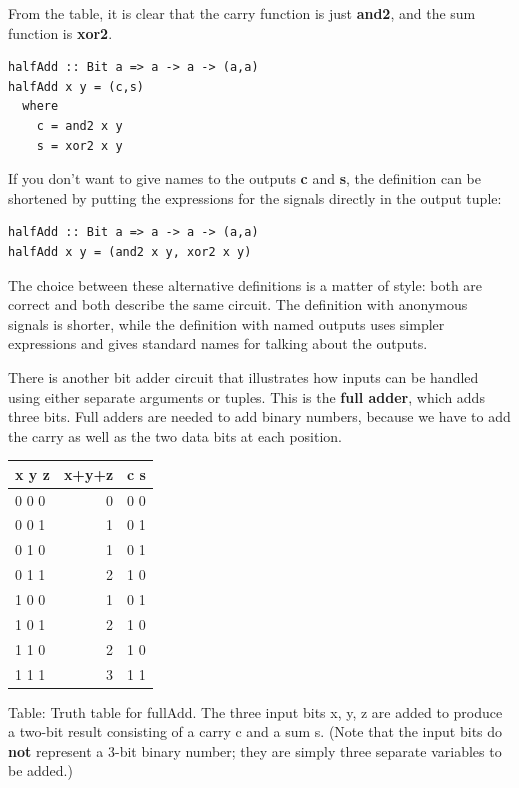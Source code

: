 \documentclass[]{svmono}
\begin{document}
From the table, it is clear that the carry function is just \textbf{and2},
and the sum function is \textbf{xor2}.


\begin{verbatim}
halfAdd :: Bit a => a -> a -> (a,a)
halfAdd x y = (c,s)
  where
    c = and2 x y
    s = xor2 x y
\end{verbatim}


If you don't want to give names to the outputs \textbf{c} and \textbf{s}, the
definition can be shortened by putting the expressions for the signals
directly in the output tuple:


\begin{verbatim}
halfAdd :: Bit a => a -> a -> (a,a)
halfAdd x y = (and2 x y, xor2 x y)
\end{verbatim}


The choice between these alternative definitions is a matter of style:
both are correct and both describe the same circuit.  The definition
with anonymous signals is shorter, while the definition with named
outputs uses simpler expressions and gives standard names for talking
about the outputs.

There is another bit adder circuit that illustrates how inputs can be
handled using either separate arguments or tuples.  This is the \textbf{full
adder}, which adds three bits.  Full adders are needed to add binary
numbers, because we have to add the carry as well as the two data bits
at each position.

\begin{center}
\begin{tabular}{lrl}
x  y  z & x+y+z & c  s\\
\hline
0  0  0 & 0 & 0  0\\
0  0  1 & 1 & 0  1\\
0  1  0 & 1 & 0  1\\
0  1  1 & 2 & 1  0\\
1  0  0 & 1 & 0  1\\
1  0  1 & 2 & 1  0\\
1  1  0 & 2 & 1  0\\
1  1  1 & 3 & 1  1\\
\end{tabular}
\end{center}

Table: Truth table for fullAdd.  The three input bits x, y, z are
added to produce a two-bit result consisting of a carry c and a sum s.
(Note that the input bits do \textbf{not} represent a 3-bit binary number;
they are simply three separate variables to be added.)
\end{document}
